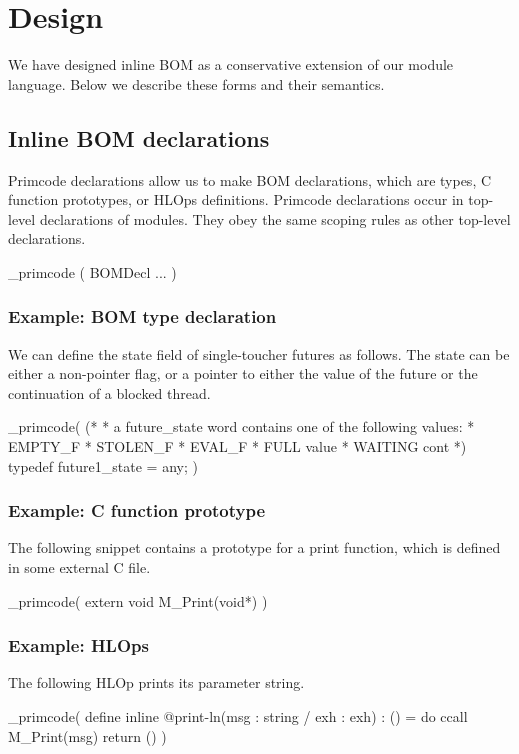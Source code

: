 \documentclass[11pt]{article}
\begin{document}
\section{Design}
We have designed inline BOM as a conservative extension of our module language. Below we describe these forms and their semantics.

\subsection{Inline BOM declarations}
Primcode declarations allow us to make BOM declarations, which are types, C function prototypes, or HLOps definitions. Primcode declarations occur in top-level declarations of modules. They obey the same scoping rules as other top-level declarations.
\begin{centercode}
  _primcode (
    BOMDecl ...
  )
\end{centercode}

\subsubsection{Example: BOM type declaration}
We can define the state field of single-toucher futures as follows. The state can be either a non-pointer flag, or a pointer to either the value of the future or the continuation of a blocked thread. 
\begin{centercode}
  _primcode( 
    (*
     * a future_state word contains one of the following values:
     *          EMPTY_F
     *          STOLEN_F
     *          EVAL_F
     *          FULL      value
     *          WAITING   cont
     *)
    typedef future1_state = any; 
  )
\end{centercode}

\subsubsection{Example: C function prototype}
The following snippet contains a prototype for a print function, which is defined in some external C file.
\begin{centercode}
  _primcode(
    extern void M_Print(void*)
  )
\end{centercode}

\subsubsection{Example: HLOps}
The following HLOp prints its parameter string.
\begin{centercode}
  _primcode(
    define inline @print-ln(msg : string / exh : exh) : () =
      do ccall M_Print(msg)
      return ()
  )
\end{centercode}
\end{document}
